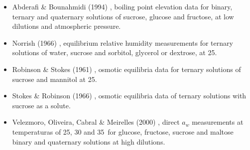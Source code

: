 \begin{itemize}
		\begin{itemize}
			\item Abderafi \& Bounahmidi (1994) \cite{abderafi1994},
				boiling point elevation data for binary, ternary
				and quaternary solutions of sucrose, glucose and
				fructose, at low dilutions and atmospheric pressure.
			\item Norrish (1966) \cite{norrish1966}, equilibrium
				relative humidity measurements for ternary solutions
				of water, sucrose and sorbitol, glycerol or dextrose,
				at 25\textcelsius.
			\item Robinson \& Stokes (1961) \cite{stokes1961},
				osmotic equilibria data for ternary solutions
				of sucrose and mannitol at 25\textcelsius.
			\item Stokes \& Robinson (1966) \cite{stokes1966},
				osmotic equilibria data of ternary solutions with
				sucrose as a solute.
			\item Velezmoro, Oliveira, Cabral \& Meirelles (2000)
				\cite{velezmoro2000}, direct $a_w$ measurements
				at temperaturas of 25, 30 and 35\textcelsius\ for
				glucose, fructose, sucrose and maltose binary and
				quaternary solutions at high dilutions.
		\end{itemize}
\end{itemize}

